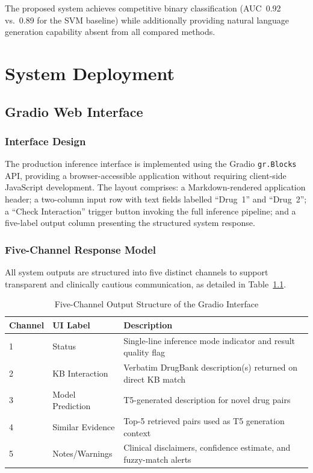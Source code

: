 \documentclass[12pt,a4paper,oneside]{report}
\begin{document}
The proposed system achieves competitive binary classification (AUC~0.92 vs.\ 0.89 for the
SVM baseline) while additionally providing natural language generation capability absent from
all compared methods.

\chapter{System Deployment}
\label{chap:deploy}

\section{Gradio Web Interface}

\subsection{Interface Design}

The production inference interface is implemented using the Gradio \texttt{gr.Blocks} API,
providing a browser-accessible application without requiring client-side JavaScript
development. The layout comprises: a Markdown-rendered application header; a two-column
input row with text fields labelled ``Drug~1'' and ``Drug~2''; a ``Check Interaction''
trigger button invoking the full inference pipeline; and a five-label output column
presenting the structured system response.

\subsection{Five-Channel Response Model}

All system outputs are structured into five distinct channels to support transparent and
clinically cautious communication, as detailed in Table~\ref{tab:output}.

\begin{table}[htbp]
\centering
\caption{Five-Channel Output Structure of the Gradio Interface}
\label{tab:output}
\begin{tabular}{p{1.8cm} p{2.8cm} p{7.8cm}}
\toprule
\textbf{Channel} & \textbf{UI Label} & \textbf{Description} \\
\midrule
1 & Status           & Single-line inference mode indicator and result quality flag \\
2 & KB Interaction   & Verbatim DrugBank description(s) returned on direct KB match \\
3 & Model Prediction & T5-generated description for novel drug pairs \\
4 & Similar Evidence & Top-5 retrieved pairs used as T5 generation context \\
5 & Notes/Warnings   & Clinical disclaimers, confidence estimate, and fuzzy-match alerts \\
\bottomrule
\end{tabular}
\end{table}
\end{document}
